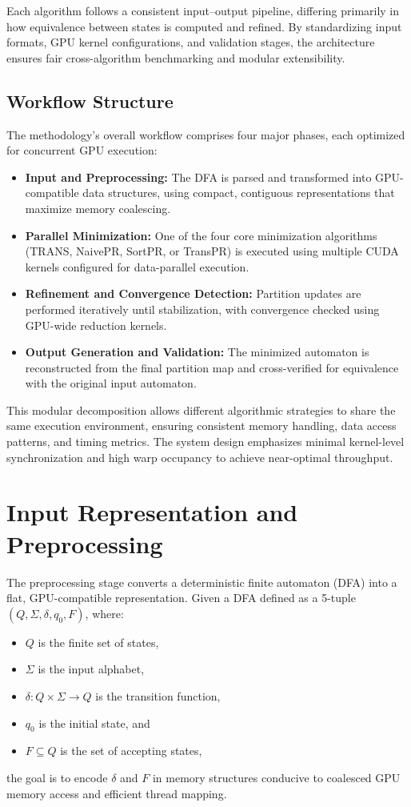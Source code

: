 Each algorithm follows a consistent input–output pipeline, differing primarily in how equivalence between states is computed and refined. By standardizing input formats, GPU kernel configurations, and validation stages, the architecture ensures fair cross-algorithm benchmarking and modular extensibility.

\subsection{Workflow Structure}

The methodology’s overall workflow comprises four major phases, each optimized for concurrent GPU execution:

\begin{itemize}
    \item \textbf{Input and Preprocessing:} The DFA is parsed and transformed into GPU-compatible data structures, using compact, contiguous representations that maximize memory coalescing.
    \item \textbf{Parallel Minimization:} One of the four core minimization algorithms (TRANS, NaivePR, SortPR, or TransPR) is executed using multiple CUDA kernels configured for data-parallel execution.
    \item \textbf{Refinement and Convergence Detection:} Partition updates are performed iteratively until stabilization, with convergence checked using GPU-wide reduction kernels.
    \item \textbf{Output Generation and Validation:} The minimized automaton is reconstructed from the final partition map and cross-verified for equivalence with the original input automaton.
\end{itemize}

This modular decomposition allows different algorithmic strategies to share the same execution environment, ensuring consistent memory handling, data access patterns, and timing metrics. The system design emphasizes minimal kernel-level synchronization and high warp occupancy to achieve near-optimal throughput.

\section{Input Representation and Preprocessing}

The preprocessing stage converts a deterministic finite automaton (DFA) into a flat, GPU-compatible representation. Given a DFA defined as a 5-tuple $(Q, \Sigma, \delta, q_0, F)$, where:
\begin{itemize}
    \item $Q$ is the finite set of states,
    \item $\Sigma$ is the input alphabet,
    \item $\delta: Q \times \Sigma \rightarrow Q$ is the transition function,
    \item $q_0$ is the initial state, and
    \item $F \subseteq Q$ is the set of accepting states,
\end{itemize}
the goal is to encode $\delta$ and $F$ in memory structures conducive to coalesced GPU memory access and efficient thread mapping.


